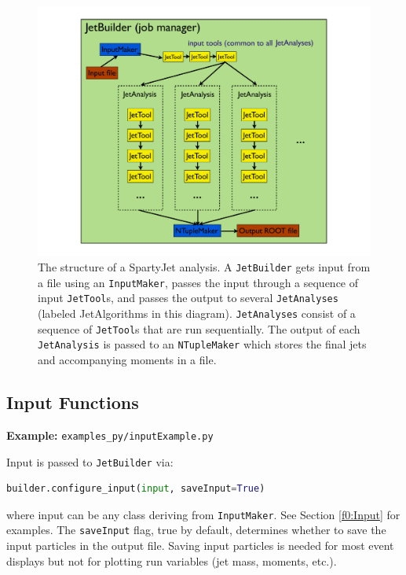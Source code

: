 \documentclass{article}
\newcommand{\code}[1]{{\tt #1}\xspace}
\newcommand{\codes}[1]{{\tt #1}s\xspace}
\begin{document}
\begin{figure}[htbp]
\begin{center}
\includegraphics[width=1.2\linewidth]{JetBuilder.pdf}
\end{center}
\caption{The structure of a SpartyJet analysis.  A \code{JetBuilder} gets input from a file using an \code{InputMaker}, passes the input through a sequence of input \codes{JetTool}, and passes the output to several \code{JetAnalyses} (labeled JetAlgorithms in this diagram).  \code{JetAnalyses} consist of a sequence of \codes{JetTool} that are run sequentially.  The output of each \code{JetAnalysis} is passed to an \code{NTupleMaker} which stores the final jets and accompanying moments in a file. }
\label{fig:JetBuilder}
\end{figure}

\subsection{Input Functions}
{\bf Example:} \verb+examples_py/inputExample.py+

Input is passed to \code{JetBuilder} via:
\begin{lstlisting}[language=Python]
builder.configure_input(input, saveInput=True)
\end{lstlisting}
where input can be any class deriving from \code{InputMaker}.  See Section \ref{f0:Input} for examples.  The \verb+saveInput+ flag, true by default, determines whether to save the input particles in the output file.  Saving input particles is needed for most event displays but not for plotting run variables (jet mass, moments, etc.).
\end{document}
